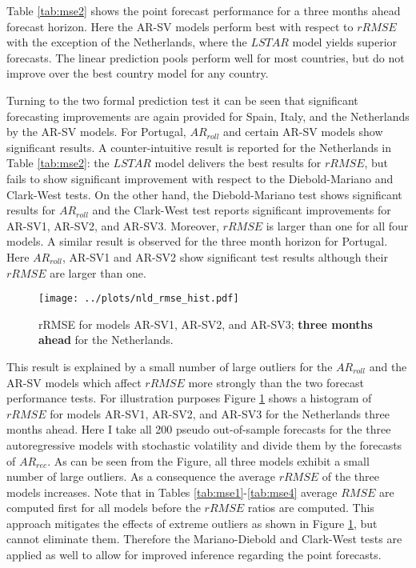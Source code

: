 \documentclass[12pt,letterpaper,fleqn]{article}           %
\begin{document}
Table \ref{tab:mse2} shows the point forecast performance for a three months ahead forecast horizon. Here the AR-SV models perform best with respect to $rRMSE$ with the exception of the Netherlands, where the $LSTAR$ model yields superior forecasts. The linear prediction pools perform well for most countries, but do not improve over the best country model for any country. 

Turning to the two formal prediction test it can be seen that significant forecasting improvements are again provided for Spain, Italy, and the Netherlands by the AR-SV models. For Portugal, $AR_{roll}$ and certain AR-SV models show significant results. A  counter-intuitive result is reported for the Netherlands in Table \ref{tab:mse2}: the $LSTAR$ model delivers the best results for $rRMSE$, but fails to show significant improvement with respect to the Diebold-Mariano and Clark-West tests. On the other hand, the Diebold-Mariano test shows significant results for $AR_{roll}$ and the Clark-West test reports significant improvements for AR-SV1, AR-SV2, and AR-SV3. Moreover, $rRMSE$ is larger than one for all four models. A similar result is observed for the three month horizon for Portugal. Here $AR_{roll}$, AR-SV1 and AR-SV2 show significant test results although their $rRMSE$ are larger than one. 

\begin{figure}
\captionsetup{singlelinecheck=false, justification=justified}
\centering \texttt{[image: ../plots/nld\_rmse\_hist.pdf]} 
\caption{rRMSE for models AR-SV1, AR-SV2, and AR-SV3; \textbf{three months ahead} for the Netherlands.}
\label{fig:hist_rmse_nld} 
\end{figure}
 

This result is explained by a small number of large outliers for the $AR_{roll}$ and the AR-SV models which affect $rRMSE$ more strongly than the two forecast performance tests. For illustration purposes Figure \ref{fig:hist_rmse_nld} shows a histogram of $rRMSE$ for models AR-SV1, AR-SV2, and AR-SV3 for the Netherlands three months ahead. Here I take all 200 pseudo out-of-sample forecasts for the three autoregressive models with stochastic volatility and divide them by the forecasts of $AR_{rec}$. As can be seen from the Figure, all three models exhibit a small number of large outliers. As a consequence the average $rRMSE$ of the three models increases. Note that in Tables \ref{tab:mse1}-\ref{tab:mse4} average $RMSE$ are computed first for all models before the $rRMSE$ ratios are computed. This approach mitigates the effects of extreme outliers as shown in Figure \ref{fig:hist_rmse_nld}, but cannot eliminate them. Therefore the Mariano-Diebold and Clark-West tests are applied as well to allow for improved inference regarding the point forecasts.
\end{document}
